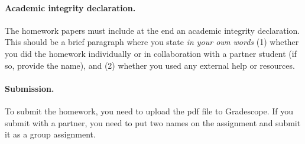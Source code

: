 \documentclass{article}
\begin{document}
\paragraph{Academic integrity declaration.}
The homework papers must include at the end an academic integrity declaration. This should be a brief paragraph where you state
\emph{in your own words}  (1) whether you did the homework individually or in collaboration with a partner student (if so, provide the name), 
and (2) whether you used any external help or resources. 




\vskip 0.1in

\paragraph{Submission.}
To submit the homework, you need to upload the pdf file to Gradescope. If you submit with a partner, you need
to put two names on the assignment and submit it as a group assignment.
\end{document}

